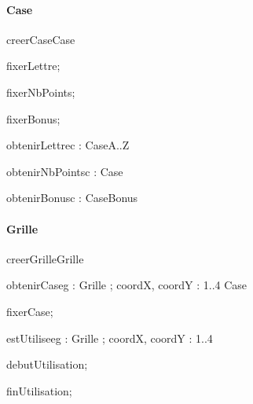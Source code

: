 \paragraph{Case}
\begin{algorithme}
  \signaturefonction
  {creerCase}{}{Case}

  \signatureprocedure
  {fixerLettre}{; }

  \signatureprocedure
  {fixerNbPoints}{; }

  \signatureprocedure
  {fixerBonus}{; }

  \signaturefonction
  {obtenirLettre}{c : Case}{A..Z}

  \signaturefonction
  {obtenirNbPoints}{c : Case}{\naturelNonNul}

  \signaturefonction
  {obtenirBonus}{c : Case}{Bonus}

\end{algorithme}

\paragraph{Grille}
\begin{algorithme}
  \signaturefonction
  {creerGrille}{}{Grille}

  \signaturefonction
  {obtenirCase}{g : Grille ; coordX, coordY : 1..4 }{Case}

  \signatureprocedure
  {fixerCase}{; }

  \signaturefonction
  {estUtilisee}{g : Grille ; coordX, coordY : 1..4}{\booleen}

  \signatureprocedure
  {debutUtilisation}{; }

  \signatureprocedure
  {finUtilisation}{; }

\end{algorithme}
